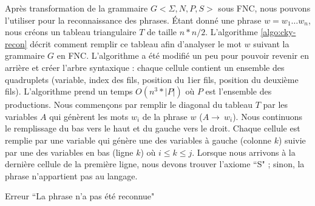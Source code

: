 \documentclass{KodeBook}
\begin{document}
Après transformation de la grammaire $G <\Sigma, N, P, S>$ sous FNC, nous pouvons l'utiliser pour la reconnaissance des phrases. 
Étant donné une phrase $w = w_1 \ldots w_n$, nous créons un tableau triangulaire $T$ de taille $n*n/2$. 
L'algorithme \ref{algo:cky-recon} décrit comment remplir ce tableau afin d'analyser le mot $w$ suivant la grammaire $G$ en FNC. 
L'algorithme a été modifié un peu pour pouvoir revenir en arrière et créer l'arbre syntaxique : chaque cellule contient un ensemble des quadruplets (variable, index des fils, position du 1ier fils, position du deuxième fils).
L'algorithme prend un temps $O(n^3 * |P|)$ où $P$ est l'ensemble des productions.
Nous commençons par remplir le diagonal du tableau $T$ par les variables $A$ qui génèrent les mots $w_i$ de la phrase $w$ ($A \rightarrow\ w_i$). 
Nous continuons le remplissage du bas vers le haut et du gauche vers le droit. 
Chaque cellule est remplie par une variable qui génère une des variables à gauche (colonne $k$) suivie par une des variables en bas (ligne $k$) où $i \le k \le j$.
Lorsque nous arrivons à la dernière cellule de la première ligne, nous devons trouver l'axiome ``S" ; sinon, la phrase n'appartient pas au langage.
%	
%	
%	
%	
\begin{algorithm}[ht]
	
	
	
	 {
		Erreur ``La phrase n'a pas été reconnue"\;
	}
	
	\caption{Reconnaissance d'une phrase en utilisant la méthode CKY}
	\label{algo:cky-recon}
\end{algorithm}
\end{document}
